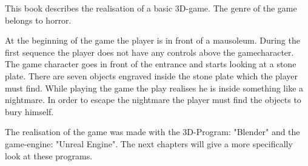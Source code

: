 This book describes the realisation of a basic 3D-game.
The genre of the game belongs to horror.

At the beginning of the game the player is in front of a mausoleum.
During the first sequence the player does not have any controls above the gamecharacter.
The game character goes in front of the entrance and starts looking at a stone plate.
There are seven objects engraved inside the stone plate which the player must find.
While playing the game the play realises he is inside something like a nightmare.
In order to escape the nightmare the player must find the objects to bury himself.

The realisation of the game was made with the 3D-Program: "Blender" and the game-engine: "Unreal Engine".
The next chapters will give a more specifically look at these programs.
